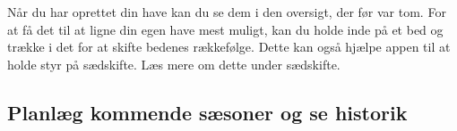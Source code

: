 \begin{minipage}{0.5\textwidth}
Når du har oprettet din have kan du se dem i den oversigt, der før var tom.
For at få det til at ligne din egen have mest muligt, kan du holde inde på et bed og trække i det for at skifte bedenes rækkefølge. Dette kan også hjælpe appen til at holde styr på sædskifte. Læs mere om dette under sædskifte.
\end{minipage}

\subsection{Planlæg kommende sæsoner og se historik}
\begin{minipage}{0.4\textwidth}
\begin{figure}[H]
    
\end{figure}
\end{minipage}
